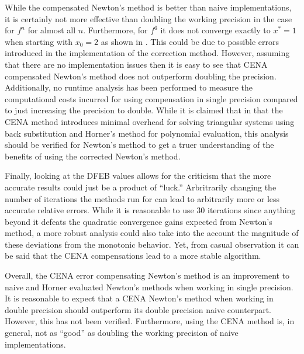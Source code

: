 \documentclass{standalone}
\begin{document}
	While the compensated Newton's method is better than naive implementations, it is certainly not more effective than doubling the working precision in the case for $f^{n}$ for almost all $n$. Furthermore, for $f^{6}$ it does not converge exactly to $x^{*}=1$ when starting with $x_{0}=2$ as shown in \cite{langlois2004more}. This could be due to possible errors introduced in the implementation of the correction method. However, assuming that there are no implementation issues then it is easy to see that CENA compensated Newton's method does not outperform doubling the precision. Additionally, no runtime analysis has been performed to measure the computational costs incurred for using compensation in single precision compared to just increasing the precision to double. While it is claimed that in \cite{langlois2004more} that the CENA method introduces minimal overhead for solving triangular systems using back substitution and Horner's method for polynomial evaluation, this analysis should be verified for Newton's method to get a truer understanding of the benefits of using the corrected Newton's method. 
	\par
	Finally, looking at the DFEB values allows for the criticism that the more accurate results could just be a product of ``luck.'' Arbritrarily changing the number of iterations the methods run for can lead to arbitrarily more or less accurate relative errors. While it is reasonable to use $30$ iterations since anything beyond it defeats the quadratic convergence gains expected from Newton's method, a more robust analysis could also take into the account the magnitude of these deviations from the monotonic behavior. Yet, from casual observation it can be said that the CENA compensations lead to a more stable algorithm.
	\par
	Overall, the CENA error compensating Newton's method is an improvement to naive and Horner evaluated Newton's methods when working in single precision. It is reasonable to expect that a CENA Newton's method when working in double precision should outperform its double precision naive counterpart. However, this has not been verified. Furthermore, using the CENA method is, in general, not as ``good'' as doubling the working precision of naive implementations.
\end{document}
